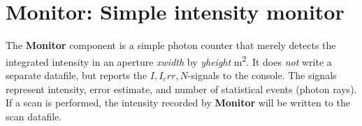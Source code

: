 \section{Monitor: Simple intensity monitor}

The \textbf{Monitor} component is a simple photon counter that merely detects the integrated
intensity in an aperture \textit{xwidth} by \textit{yheight} \si{\metre\squared}. It does \emph{not} write
a separate datafile, but reports the $I, I_err, N$-signals to the console. The signals represent
 intensity, error estimate, and number of statistical events (photon rays). If a scan is performed, the intensity recorded by \textbf{Monitor}
will be written to the scan datafile.
